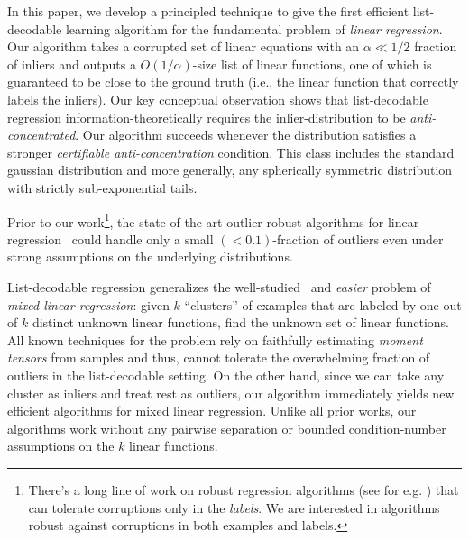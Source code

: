\documentclass{article}
\theoremstyle{definition}
\theoremstyle{remark}
\numberwithin{equation}{section}
\newcommand{\1}{\bm{1}}
\begin{document}
In this paper, we develop a principled technique to give the first efficient list-decodable learning algorithm for the fundamental problem of \emph{linear regression}. Our algorithm takes a corrupted set of linear equations with an $\alpha \ll 1/2$ fraction of inliers and outputs a $O(1/\alpha)$-size list of linear functions, one of which is guaranteed to be close to the ground truth (i.e., the linear function that correctly labels the inliers). Our key conceptual observation shows that list-decodable regression information-theoretically requires the inlier-distribution to be \emph{anti-concentrated}. Our algorithm succeeds whenever the distribution satisfies a stronger \emph{certifiable anti-concentration} condition. This class includes the standard gaussian distribution and more generally, any spherically symmetric distribution with strictly sub-exponential tails.

Prior to our work\footnote{There's a long line of work on robust regression algorithms (see for e.g. \cite{DBLP:conf/nips/Bhatia0KK17,conf/soda/KarmalkarP19}) that can tolerate corruptions only in the \emph{labels}. We are interested in algorithms robust against corruptions in both examples and labels.}, the state-of-the-art outlier-robust algorithms for linear regression~\cite{DBLP:conf/colt/KlivansKM18,conf/soda/DiakonikolasKS19,journals/corr/abs-1803-02815,journals/corr/abs-1802-06485} could handle only a small $(<0.1)$-fraction of outliers even under strong assumptions on the underlying distributions. 

List-decodable regression generalizes the well-studied~\cite{MR1028403,doi:10.1162/neco.1994.6.2.181,MR2757044,2013arXiv1310.3745Y,DBLP:journals/corr/BalakrishnanWY14,DBLP:conf/colt/ChenYC14,DBLP:conf/nips/Zhong0D16,DBLP:conf/aistats/SedghiJA16,DBLP:conf/colt/LiL18} and {\em easier} problem of \emph{mixed linear regression}: given $k$ ``clusters'' of examples that are labeled by one out of $k$ distinct unknown linear functions, find the unknown set of linear functions. All known techniques for the problem rely on faithfully estimating \emph{moment tensors} from samples and thus, cannot tolerate the overwhelming fraction of outliers in the list-decodable setting. On the other hand, since we can take any cluster as inliers and treat rest as outliers, our algorithm immediately yields new efficient algorithms for mixed linear regression. Unlike all prior works, our algorithms work without any pairwise separation or bounded condition-number assumptions on the $k$ linear functions. 
\end{document}
